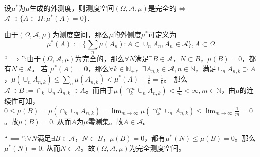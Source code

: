 \documentclass{ctexart}
\begin{document}
\begin{problem}\label{pro:21}
  设\(\mu^* \)为\(\mu \)生成的外测度，则测度空间\((\Omega,\mathcal{A},\mu) \)是完全的\(\iff \) \(\mathcal{A} \supset \{A \subset  \Omega:\mu^*(A)=0\} \).
\end{problem}
\begin{solution}
    由于\((\Omega,\mathcal{A},\mu) \)为测度空间，那么\(\mu \)的外侧度\(\mu^* \)可定义为
  \[
    \mu^*(A):=\{\sum_{n}\mu(A_n):A \subset \cup_n A_n, A_n \in \mathcal{A}\}, A \subset \Omega
  \]
  ``\(\implies\)'':由于\((\Omega,\mathcal{A},\mu) \)为完全的，那么\(\forall N \)满足\(\exists B \in \mathcal{A} \)，\(N \subset B \)，\(\mu(B)=0 \)，都有\(N \in \mathcal{A} \)。
  若 \(\mu^*(A)=0\)，那么\(\forall k \in \mathbb{N}_{+} \)，\(\exists A_{n,k} \in \mathcal{A}, n \in \mathbb{N} \)，满足\(\cup_{n} A_{n,k} \supset A \)，\( \mu(\cup_n A_{n,k}) \leq \sum_n \mu(A_{n,k}) < \mu^*(A) + \frac{1}{k} =\frac{1}{k}\)。
  那么\( \mathcal{A}\ni  B:=\cap_k \cup_n A_{n,k} \supset A \)。而由于\(\mu(\cap_k^m \cup_n A_{n,k} ) < \frac{1}{m}<\infty, m \in \mathbb{N}\)，由\(\mu \)的连续性可知，
  \(0 \leq \mu(B)=\mu(\cap_k \cup_n A_{n,k}) = \lim_{m \to \infty } \mu(\cap_k^m \cup_n A_{n,k}) \leq \lim_{m \to \infty} \frac{1}{m} =0 \)。故\(\mu(B)=0 \).
  从而\(A \)为\(\mu \)零测集。故\(A \in \mathcal{A} \)。

  ``\(\impliedby\)'':\(\forall N \)满足\(\exists B \in \mathcal{A} \)，\(N \subset B \)，\(\mu(B)=0 \)，都有\(\mu^*(N) \leq \mu(B)=0 \)。那么\(\mu^*(N)=0 \).
  从而\(N \in \mathcal{A} \)。故\((\Omega, \mathcal{A}, \mu) \)为完全测度空间。
\end{solution}
\end{document}
